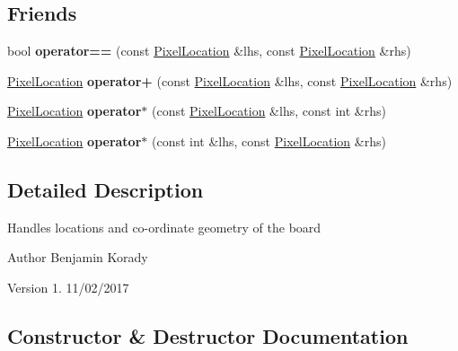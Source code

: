 \subsection*{Friends}
\begin{DoxyCompactItemize}
\item 
\mbox{\label{class_pixel_location_aa18747fd0126b0c3aae3a5607d6f0558}} 
bool {\bfseries operator==} (const \hyperlink{class_pixel_location}{Pixel\+Location} \&lhs, const \hyperlink{class_pixel_location}{Pixel\+Location} \&rhs)
\item 
\mbox{\label{class_pixel_location_a7f5b4182379a0f08e8d21ec8b6cfcba6}} 
\hyperlink{class_pixel_location}{Pixel\+Location} {\bfseries operator+} (const \hyperlink{class_pixel_location}{Pixel\+Location} \&lhs, const \hyperlink{class_pixel_location}{Pixel\+Location} \&rhs)
\item 
\mbox{\label{class_pixel_location_a453ad939f9bd11b1a701e0dc451ca909}} 
\hyperlink{class_pixel_location}{Pixel\+Location} {\bfseries operator$\ast$} (const \hyperlink{class_pixel_location}{Pixel\+Location} \&lhs, const int \&rhs)
\item 
\mbox{\label{class_pixel_location_accdf97451b61a763a90d8b0ce3a44ef3}} 
\hyperlink{class_pixel_location}{Pixel\+Location} {\bfseries operator$\ast$} (const int \&lhs, const \hyperlink{class_pixel_location}{Pixel\+Location} \&rhs)
\end{DoxyCompactItemize}


\subsection{Detailed Description}
Handles locations and co-\/ordinate geometry of the board

\begin{DoxyAuthor}{Author}
Benjamin Korady 
\end{DoxyAuthor}
\begin{DoxyVersion}{Version}
1. 11/02/2017 
\end{DoxyVersion}


\subsection{Constructor \& Destructor Documentation}
\mbox{\label{class_pixel_location_acddc215e41c58ee73035c82b56c4c44c}} 
